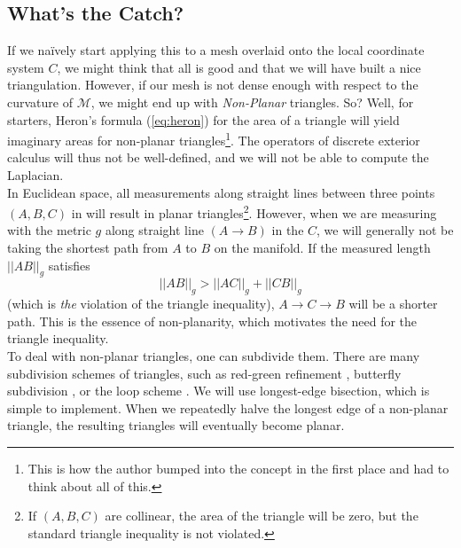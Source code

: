 \subsection*{What's the Catch?}
If we naïvely start applying this to a mesh overlaid onto the local coordinate system $C$, we might think that all is good and that we will have built a nice triangulation. However, if our mesh is not dense enough with respect to the curvature of $\mathcal{M}$, we might end up with \textit{Non-Planar} triangles.
So? Well, for starters, Heron's formula (\ref{eq:heron}) for the area of a triangle will yield imaginary areas for non-planar triangles\footnote{This is how the author bumped into the concept in the first place and had to think about all of this.}. The operators of discrete exterior calculus will thus not be well-defined, and we will not be able to compute the Laplacian.
\\
In Euclidean space, all measurements along straight lines between three points $(A, B, C)$ in will result in planar triangles\footnote{If $(A, B, C)$ are collinear, the area of the triangle will be zero, but the standard triangle inequality is not violated.}. However, when we are measuring with the metric $g$ along straight line $(A \to B)$ in the $C$, we will generally not be taking the shortest path from $A$ to $B$ on the manifold. If the measured length $||AB||_g$ satisfies
$$||AB||_g > ||AC||_g + ||CB||_g$$
(which is \textit{the} violation of the triangle inequality), $A \to C \to B$ will be a shorter path. This is the essence of non-planarity, which motivates the need for the triangle inequality.
\\
To deal with non-planar triangles, one can subdivide them. There are many subdivision schemes of triangles, such as red-green refinement \cite{puppo2008rgbdivision}, butterfly subdivision \cite{dyn1990butterflydivision}, or the loop scheme \cite{loop1987smoothloopdivision}. We will use longest-edge bisection\cite{longest_edge_bisection}, which is simple to implement. When we repeatedly halve the longest edge of a non-planar triangle, the resulting triangles will eventually become planar.
